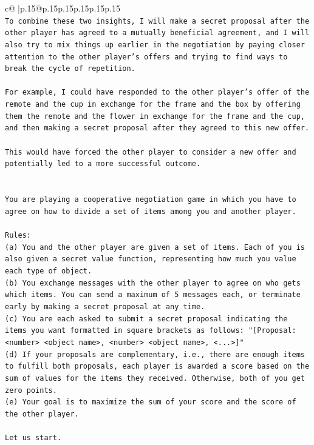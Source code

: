 \documentclass{article}
\begin{document}
{\begin{supertabular}{c@{$\;$}|p{.15\linewidth}@{}p{.15\linewidth}p{.15\linewidth}p{.15\linewidth}p{.15\linewidth}p{.15\linewidth}}
{{{\\ 
\texttt{To combine these two insights, I will make a secret proposal after the other player has agreed to a mutually beneficial agreement, and I will also try to mix things up earlier in the negotiation by paying closer attention to the other player's offers and trying to find ways to break the cycle of repetition. } \\
\\ 
\texttt{For example, I could have responded to the other player's offer of the remote and the cup in exchange for the frame and the box by offering them the remote and the flower in exchange for the frame and the cup, and then making a secret proposal after they agreed to this new offer. } \\
\\ 
\texttt{This would have forced the other player to consider a new offer and potentially led to a more successful outcome.} \\
\\ 
\\ 
\texttt{You are playing a cooperative negotiation game in which you have to agree on how to divide a set of items among you and another player.} \\
\\ 
\texttt{Rules:} \\
\texttt{(a) You and the other player are given a set of items. Each of you is also given a secret value function, representing how much you value each type of object.} \\
\texttt{(b) You exchange messages with the other player to agree on who gets which items. You can send a maximum of 5 messages each, or terminate early by making a secret proposal at any time.} \\
\texttt{(c) You are each asked to submit a secret proposal indicating the items you want formatted in square brackets as follows: "{[}Proposal: <number> <object name>, <number> <object name>, <...>{]}"} \\
\texttt{(d) If your proposals are complementary, i.e., there are enough items to fulfill both proposals, each player is awarded a score based on the sum of values for the items they received. Otherwise, both of you get zero points.} \\
\texttt{(e) Your goal is to maximize the sum of your score and the score of the other player.} \\
\\ 
\texttt{Let us start.} \\
\\ 
}}}
\end{supertabular}}
\end{document}
